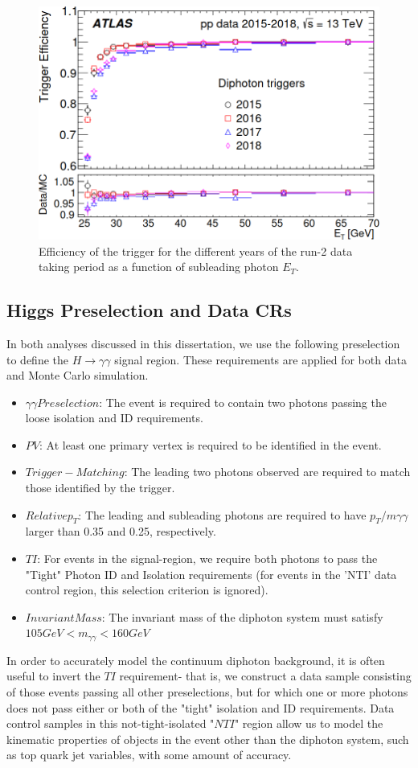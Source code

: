 \begin{figure}
\includegraphics[width=0.5\linewidth]{figures/datamc_chapter/trigger.png}
\caption{Efficiency of the trigger for the different years of the run-2 data taking period as a function of subleading photon $E_{T}$.}
\end{figure}

\subsection{Higgs Preselection and Data CRs} \label{sec:Preselection} 

In both analyses discussed in this dissertation, we use the following preselection to define the $H \rightarrow \gamma \gamma$ signal region. These requirements are applied for both data and Monte Carlo simulation. 

\begin{itemize}
\item $\gamma\gamma Preselection$: The event is required to contain two photons passing the loose isolation and ID requirements.
\item $PV$: At least one primary vertex is required to be identified in the event.
\item $Trigger-Matching$: The leading two photons observed are required to match those identified by the trigger.
\item $Relative p_{T}$: The leading and subleading photons are required to have $p_{T}/m\gamma\gamma$ larger than 0.35 and 0.25, respectively.
\item $TI$: For events in the signal-region, we require both photons to pass the "Tight" Photon ID and Isolation requirements (for events in the 'NTI' data control region, this selection criterion is ignored). 
\item $Invariant Mass$: The invariant mass of the diphoton system must satisfy $105 GeV < m_{\gamma\gamma} < 160 GeV$
\end{itemize}

In order to accurately model the continuum diphoton background, it is often useful to invert the $TI$ requirement- that is, we construct a data sample consisting of those events passing all other preselections, but for which one or more photons does not pass either or both of the "tight" isolation and ID requirements. Data control samples in this not-tight-isolated "$NTI$" region allow us to model the kinematic properties of objects in the event other than the diphoton system, such as top quark jet variables, with some amount of accuracy.

